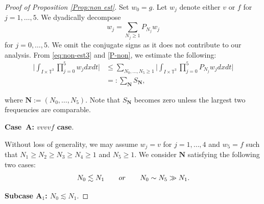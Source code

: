 \documentclass[letterpaper, 11pt,  reqno]{amsart}
\newcommand{\1}{\hspace{0.5mm}\text{I}\hspace{0.5mm}}
\newcommand{\noi}{\noindent}
\newcommand{\T}{\mathbb{T}}
\newcommand{\les}{\lesssim}
\newcommand{\Nb}{\mathbf{N}}
\numberwithin{equation}{section}
\numberwithin{theorem}{section}
\begin{document}
\begin{proof}[Proof of Proposition \ref{Prop:non est}]
Set
$w_0 = g$.
Let $w_j$ denote either $v$ or $f$ for $j=1, \dots, 5$.
We dyadically decompose 
\[
w_j =\sum_{N_j\geq1} P_{N_j} w_j
\]
for $j=0, \dots, 5$.
We omit the conjugate signs as it does not contribute to our analysis.
From \eqref{eq:non-est3} and \eqref{P-non},
we estimate the following:
\begin{equation}
\begin{aligned}
\bigg| \int_{I\times \T^3} \prod_{j=0}^5  w_j   dxdt  \bigg|
&\le
\sum_{N_0, \dots, N_5 \ge 1}
\bigg| \int_{I\times \T^3} \prod_{j=0}^5  P_{N_j} w_j  dxdt  \bigg|
\\
&=:
\sum_{\Nb}
S_{\Nb},
\end{aligned}
\label{Sum0}
\end{equation}


\noi
where $\Nb := (N_0,\dots, N_5)$.
Note that $S_\Nb$ becomes zero
unless the largest two frequencies are comparable. 




\medskip
\noi
{\bf {Case~A: $vvvvf$ case}}. 
\smallskip

Without loss of generality,  we may
assume $w_j=v$ for $j=1,\dots,4$ and $w_5=f$ 
such that
$N_1\geq N_2\geq N_3\geq N_4\geq 1$ and $N_5\geq 1$.
We consider $\Nb$ satisfying the following two cases:
\[
N_0 \les N_1
 \quad 
 \quad
 {\rm or}
 \quad 
 \quad
 N_0\sim N_5\gg N_1.
 \]

\medskip
\noi
{\bf Subcase A$_1$:
$N_0 \les N_1 $}.  
\smallskip


\end{proof}
\end{document}
